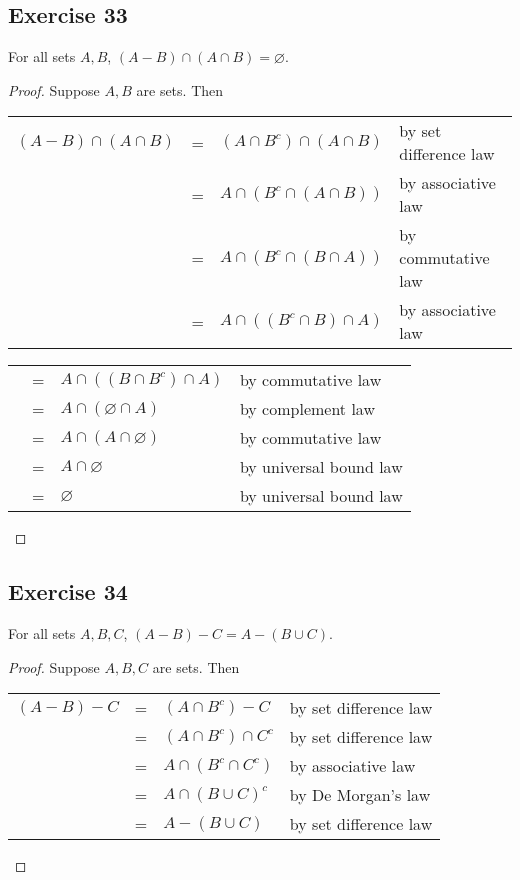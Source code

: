 \documentclass[14pt]{extarticle}
\newcommand{\es}{\varnothing}
\newcommand{\cy}{\color{cyan}}
\begin{document}
\subsection{Exercise 33}
For all sets $A, B$, \((A - B) \cap (A \cap B) = \es\).

\begin{proof}
  Suppose $A,B$ are sets. Then
  \begin{center}
    \begin{tabular}{rcll}
      \((A - B) \cap (A \cap B)\) & = & \((A \cap B^c) \cap (A \cap B)\) & {\cy by set difference law} \\
      \(\)                        & = & \(A \cap (B^c \cap (A \cap B))\) & {\cy by associative law}    \\
      \(\)                        & = & \(A \cap (B^c \cap (B \cap A))\) & {\cy by commutative law}    \\
      \(\)                        & = & \(A \cap ((B^c \cap B) \cap A)\) & {\cy by associative law}
    \end{tabular}
  \end{center}
  \begin{center}
    \begin{tabular}{rcll}
      \(\) & = & \(A \cap ((B \cap B^c) \cap A)\) & {\cy by commutative law}     \\
      \(\) & = & \(A \cap (\es \cap A)\)          & {\cy by complement law}      \\
      \(\) & = & \(A \cap (A \cap \es)\)          & {\cy by commutative law}     \\
      \(\) & = & \(A \cap \es\)                   & {\cy by universal bound law} \\
      \(\) & = & \(\es\)                          & {\cy by universal bound law}
    \end{tabular}
  \end{center}
\end{proof}

\subsection{Exercise 34}
For all sets $A, B, C$, \((A - B) - C = A - (B \cup C)\).

\begin{proof}
  Suppose $A,B,C$ are sets. Then
  \begin{center}
    \begin{tabular}{rcll}
      \((A - B) - C\) & = & \((A \cap B^c) - C\)      & {\cy by set difference law} \\
      \(\)            & = & \((A \cap B^c) \cap C^c\) & {\cy by set difference law} \\
      \(\)            & = & \(A \cap (B^c \cap C^c)\) & {\cy by associative law}    \\
      \(\)            & = & \(A \cap (B \cup C)^c\)   & {\cy by De Morgan's law}    \\
      \(\)            & = & \(A - (B \cup C)\)        & {\cy by set difference law}
    \end{tabular}
  \end{center}
\end{proof}
\end{document}
